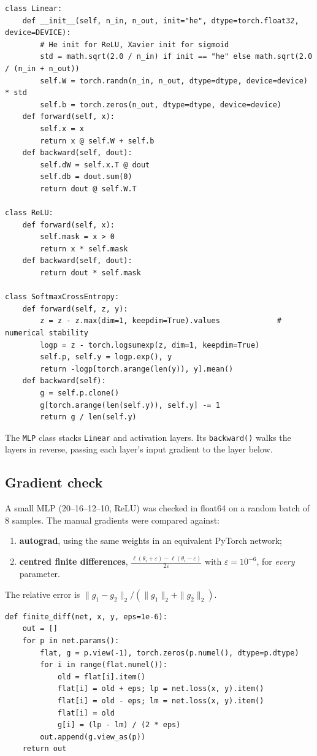 \documentclass[11pt,a4paper]{article}
\begin{document}
\begin{lstlisting}
class Linear:
    def __init__(self, n_in, n_out, init="he", dtype=torch.float32, device=DEVICE):
        # He init for ReLU, Xavier init for sigmoid
        std = math.sqrt(2.0 / n_in) if init == "he" else math.sqrt(2.0 / (n_in + n_out))
        self.W = torch.randn(n_in, n_out, dtype=dtype, device=device) * std
        self.b = torch.zeros(n_out, dtype=dtype, device=device)
    def forward(self, x):
        self.x = x
        return x @ self.W + self.b
    def backward(self, dout):
        self.dW = self.x.T @ dout
        self.db = dout.sum(0)
        return dout @ self.W.T

class ReLU:
    def forward(self, x):
        self.mask = x > 0
        return x * self.mask
    def backward(self, dout):
        return dout * self.mask

class SoftmaxCrossEntropy:
    def forward(self, z, y):
        z = z - z.max(dim=1, keepdim=True).values             # numerical stability
        logp = z - torch.logsumexp(z, dim=1, keepdim=True)
        self.p, self.y = logp.exp(), y
        return -logp[torch.arange(len(y)), y].mean()
    def backward(self):
        g = self.p.clone()
        g[torch.arange(len(self.y)), self.y] -= 1
        return g / len(self.y)
\end{lstlisting}
The \texttt{MLP} class stacks \texttt{Linear} and activation layers. Its \texttt{backward()} walks the layers in reverse, passing each layer's input gradient to the layer below.

\subsection{Gradient check}

A small MLP (20--16--12--10, ReLU) was checked in float64 on a random batch of 8 samples. The manual gradients were compared against:
\begin{enumerate}
  \item \textbf{autograd}, using the same weights in an equivalent PyTorch network;
  \item \textbf{centred finite differences}, $\frac{\ell(\theta_i+\varepsilon)-\ell(\theta_i-\varepsilon)}{2\varepsilon}$ with $\varepsilon=10^{-6}$, for \emph{every} parameter.
\end{enumerate}
The relative error is $\|g_1-g_2\|_2/(\|g_1\|_2+\|g_2\|_2)$.

\begin{lstlisting}
def finite_diff(net, x, y, eps=1e-6):
    out = []
    for p in net.params():
        flat, g = p.view(-1), torch.zeros(p.numel(), dtype=p.dtype)
        for i in range(flat.numel()):
            old = flat[i].item()
            flat[i] = old + eps; lp = net.loss(x, y).item()
            flat[i] = old - eps; lm = net.loss(x, y).item()
            flat[i] = old
            g[i] = (lp - lm) / (2 * eps)
        out.append(g.view_as(p))
    return out
\end{lstlisting}
\end{document}
